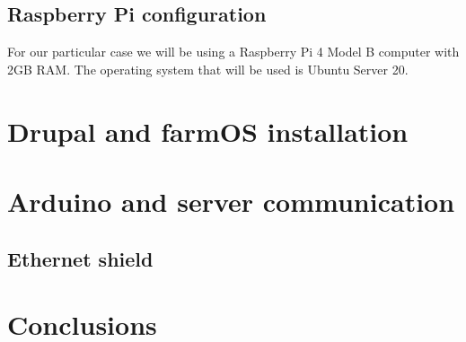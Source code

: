 \subsection{Raspberry Pi configuration}
For our particular case we will be using a Raspberry Pi 4 Model B computer with 2GB RAM. The operating system that will be used is Ubuntu Server 20.
\section{Drupal and farmOS installation}


\section{Arduino and server communication}

\subsection{Ethernet shield}

\section{Conclusions}



